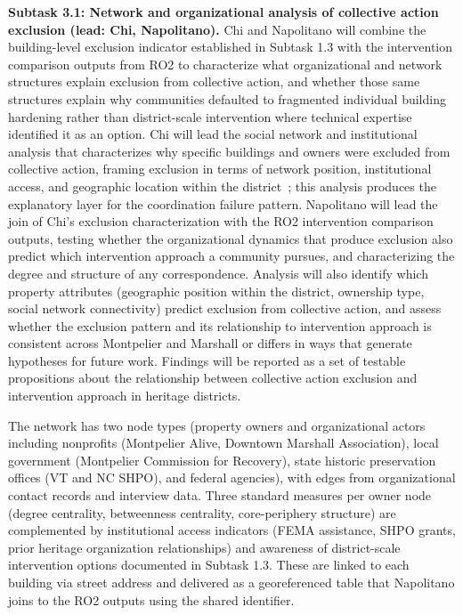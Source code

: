 \documentclass[11pt]{article}
\begin{document}
\textbf{Subtask 3.1: Network and organizational analysis of collective action exclusion (lead: Chi, Napolitano).}
Chi and Napolitano will combine the building-level exclusion indicator established
in Subtask 1.3 with the intervention comparison outputs from RO2 to characterize
what organizational and network structures explain exclusion from collective action,
and whether those same structures explain why communities defaulted to fragmented
individual building hardening rather than district-scale intervention where technical
expertise identified it as an option.
Chi will lead the social network and institutional analysis that characterizes why
specific buildings and owners were excluded from collective action, framing exclusion
in terms of network position, institutional access, and geographic location within
the district~\cite{yin2021characterizing,yang2020untangle}; this analysis produces
the explanatory layer for the coordination failure pattern.
Napolitano will lead the join of Chi's exclusion characterization with the RO2
intervention comparison outputs, testing whether the organizational dynamics that
produce exclusion also predict which intervention approach a community pursues,
and characterizing the degree and structure of any correspondence.
Analysis will also identify which property attributes (geographic position within
the district, ownership type, social network connectivity) predict exclusion from
collective action, and assess whether the exclusion pattern and its relationship
to intervention approach is consistent across Montpelier and Marshall or differs
in ways that generate hypotheses for future work.
Findings will be reported as a set of testable propositions about the relationship
between collective action exclusion and intervention approach in heritage districts.

The network has two node types (property owners and organizational actors including
nonprofits (Montpelier Alive, Downtown Marshall Association), local government
(Montpelier Commission for Recovery), state historic preservation offices (VT and
NC SHPO), and federal agencies), with edges from organizational contact records
and interview data.
Three standard measures per owner node (degree centrality, betweenness centrality,
core-periphery structure) are complemented by institutional access indicators
(FEMA assistance, SHPO grants, prior heritage organization relationships) and
awareness of district-scale intervention options documented in Subtask 1.3.
These are linked to each building via street address and delivered as a
georeferenced table that Napolitano joins to the RO2 outputs using the shared
identifier.
\end{document}
